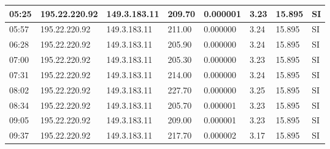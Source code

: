 \begin{table}[H]
\begin{tabular}{|l|l|l|l|l|l|l|l|}
05:25 & 195.22.220.92 & 149.3.183.11 & 209.70 & 0.000001 & 3.23 & 15.895 & SI \\ \hline
05:57 & 195.22.220.92 & 149.3.183.11 & 211.00 & 0.000000 & 3.24 & 15.895 & SI \\ \hline
06:28 & 195.22.220.92 & 149.3.183.11 & 205.90 & 0.000000 & 3.24 & 15.895 & SI \\ \hline
07:00 & 195.22.220.92 & 149.3.183.11 & 205.30 & 0.000000 & 3.23 & 15.895 & SI \\ \hline
07:31 & 195.22.220.92 & 149.3.183.11 & 214.00 & 0.000000 & 3.24 & 15.895 & SI \\ \hline
08:02 & 195.22.220.92 & 149.3.183.11 & 227.70 & 0.000000 & 3.25 & 15.895 & SI \\ \hline
08:34 & 195.22.220.92 & 149.3.183.11 & 205.70 & 0.000001 & 3.23 & 15.895 & SI \\ \hline
09:05 & 195.22.220.92 & 149.3.183.11 & 209.00 & 0.000001 & 3.23 & 15.895 & SI \\ \hline
09:37 & 195.22.220.92 & 149.3.183.11 & 217.70 & 0.000002 & 3.17 & 15.895 & SI \\ \hline
	\end{tabular}
\end{table}

